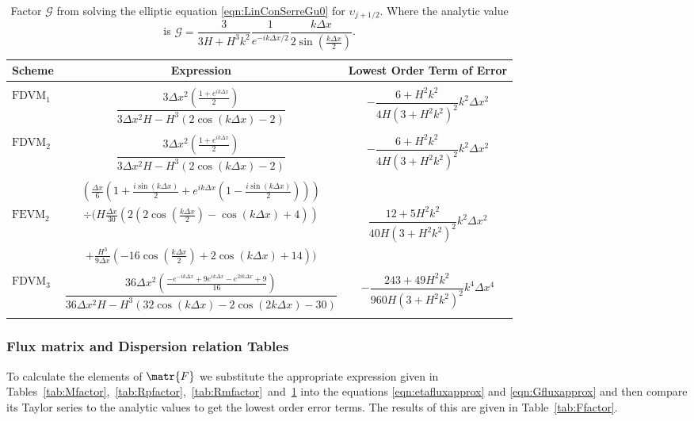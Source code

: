 \begin{table}
	\centering   
	\begin{tabular}{l  c  c}
	      	Scheme& Expression& Lowest Order Term of Error\\
	      	\hline && \\
	      	$\text{FDVM}_1$& $\dfrac{3 \Delta x^2 \left(\frac{1 + e^{ik\Delta x}}{2}\right)}{3 \Delta x^2 H - H^3 \left(2\cos\left(k\Delta x\right) - 2\right)}$ & $-\dfrac{6 +H^2k^2}{4H \left(3 + H^2k^2\right)^2}k^2 \Delta x^2$ \\ & & \\
	      	$\text{FDVM}_2$& $\dfrac{3 \Delta x^2 \left(\frac{1 + e^{ik\Delta x}}{2}\right)}{3 \Delta x^2 H - H^3 \left(2\cos\left(k\Delta x\right) - 2\right)}$ & $-\dfrac{6 +H^2k^2}{4H \left(3 + H^2k^2\right)^2}k^2 \Delta x^2$ \\ & & \\
	  & $\left(\frac{\Delta x}{6} \left(1 + \frac{i \sin\left(k \Delta x\right)}{2} + e^{ik\Delta x}\left(1 - \frac{i \sin\left(k \Delta x\right)}{2}\right) \right)\right)$ & \\  $\text{FEVM}_2$ & $\div  \Bigg(H\frac{\Delta x}{30} \left( 2\left(2\cos\left(\frac{k \Delta x}{2}\right) - \cos\left({k \Delta x}\right) + 4\right)  \right)$  & $\dfrac{12 + 5H^2k^2}{40H \left(3 + H^2k^2\right)^2}k^2 \Delta x^2$ \\ &$+ \frac{H^3 }{9\Delta x}\left(-16\cos\left(\frac{k\Delta x}{2}\right) + 2 \cos\left(k \Delta x\right) + 14\right)    \Bigg)$ & \\ & & \\
	      	$\text{FDVM}_3$&  $\dfrac{36 \Delta x^2 \left(\frac{-e^{-ik\Delta x} + 9e^{ik\Delta x} - e^{2ik\Delta x} + 9}{16}\right)}{36 \Delta x^2H - H^3\left(32\cos\left(k \Delta x\right) -2\cos\left(2k \Delta x\right) - 30\right)}$ & $-\dfrac{243 + 49H^2k^2}{960H\left(3 + H^2k^2\right)^2}k^4 \Delta x^4$ \\ & & \\ 
	\end{tabular}
	\caption{Factor $\mathcal{G}$ from solving the elliptic equation \eqref{eqn:LinConSerreGu0} for $\upsilon_{j+1/2}$. Where the analytic value is  $\mathcal{G} = \dfrac{3}{3H + H^3k^2} \dfrac{1}{e^{-ik\Delta x/2}} \dfrac{k\Delta x}{2 \sin\left(\frac{k \Delta x}{2}\right)}$.}
	\label{tab:Gfactor} 
\end{table}


\subsubsection{Flux matrix and Dispersion relation Tables}
To calculate the elements of $\matr{F}$ we substitute the appropriate expression given in Tables~\ref{tab:Mfactor},~\ref{tab:Rpfactor},~\ref{tab:Rmfactor}~and~\ref{tab:Gfactor} into the equations \eqref{eqn:etafluxapprox} and \eqref{eqn:Gfluxapprox} and then compare its Taylor series to the analytic values to get the lowest order error terms. The results of this are given in Table~\ref{tab:Ffactor}. 

